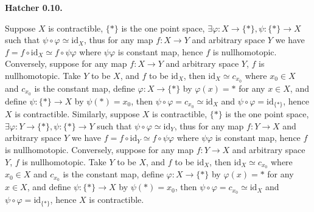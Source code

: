 \documentclass[../main.tex]{subfiles}
\begin{document}
\textbf{Hatcher 0.10.} \par
Suppose $X$ is contractible, $\{*\}$ is the one point space, $\exists \varphi:X\rightarrow \{*\}, \psi:\{*\}\rightarrow X$ such that $\psi\circ\varphi \simeq \mathrm{id}_{X}$, thus for any map $f:X\rightarrow Y$ and arbitrary space $Y$ we have $ f= f\circ\mathrm{id}_{X} \simeq f\circ\psi\varphi $ where \(\psi\varphi\) is constant map, hence $f$ is nullhomotopic. Conversely, suppose for any map $f:X\rightarrow Y$ and arbitrary space $Y$, $f$ is nullhomotopic. Take $Y$ to be $X$, and $f$ to be $\mathrm{id}_{X}$, then $\mathrm{id}_{X}\simeq c_{x_{0}}$ where $x_{0}\in X$ and $c_{x_{0}}$ is the constant map, define $\varphi:X\rightarrow \{*\}$ by $\varphi(x)=*$ for any $x\in X$, and define $\psi:\{*\}\rightarrow X$ by $\psi(*)=x_{0}$, then $\psi\circ\varphi=c_{x_{0}}\simeq\mathrm{id}_{X}$ and $\psi\circ\varphi=\mathrm{id}_{\{*\}}$, hence $X$ is contractible.
Similarly, suppose $X$ is contractible, $\{*\}$ is the one point space, $\exists \varphi:Y\rightarrow \{*\}, \psi:\{*\}\rightarrow Y$ such that $\psi\circ\varphi \simeq \mathrm{id}_{Y}$, thus for any map $f:Y\rightarrow X$ and arbitrary space $Y$ we have $ f=f\circ\mathrm{id}_{Y}\simeq f\circ\psi\varphi $ where \(\psi\varphi\) is constant map, hence $f$ is nullhomotopic. Conversely, suppose for any map $f:Y\rightarrow X$ and arbitrary space $Y$, $f$ is nullhomotopic. Take $Y$ to be $X$, and $f$ to be $\mathrm{id}_{X}$, then $\mathrm{id}_{X}\simeq c_{x_{0}}$ where $x_{0}\in X$ and $c_{x_{0}}$ is the constant map, define $\varphi:X\rightarrow \{*\}$ by $\varphi(x)=*$ for any $x\in X$, and define $\psi:\{*\}\rightarrow X$ by $\psi(*)=x_{0}$, then $\psi\circ\varphi=c_{x_{0}}\simeq\mathrm{id}_{X}$ and $\psi\circ\varphi=\mathrm{id}_{\{*\}}$, hence $X$ is contractible.
\end{document}
